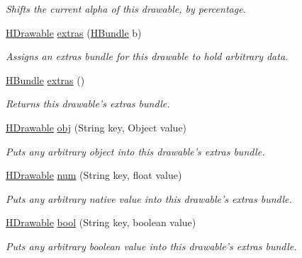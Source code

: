 \begin{DoxyCompactItemize}
\begin{DoxyCompactList}\small\item\em Shifts the current alpha of this drawable, by percentage. \end{DoxyCompactList}\item 
\hyperlink{classhype_1_1drawable_1_1_h_drawable}{H\-Drawable} \hyperlink{classhype_1_1drawable_1_1_h_drawable_ad4fa503b7d89fb5d1c75ccde9db95372}{extras} (\hyperlink{classhype_1_1util_1_1_h_bundle}{H\-Bundle} b)
\begin{DoxyCompactList}\small\item\em Assigns an {\itshape extras bundle} for this drawable to hold arbitrary data. \end{DoxyCompactList}\item 
\hyperlink{classhype_1_1util_1_1_h_bundle}{H\-Bundle} \hyperlink{classhype_1_1drawable_1_1_h_drawable_a7505189d57beed823910e448eada428e}{extras} ()
\begin{DoxyCompactList}\small\item\em Returns this drawable's {\itshape extras bundle}. \end{DoxyCompactList}\item 
\hyperlink{classhype_1_1drawable_1_1_h_drawable}{H\-Drawable} \hyperlink{classhype_1_1drawable_1_1_h_drawable_a89ded5375f1c76df4b672196303343fd}{obj} (String key, Object value)
\begin{DoxyCompactList}\small\item\em Puts any arbitrary object into this drawable's {\itshape extras bundle}. \end{DoxyCompactList}\item 
\hyperlink{classhype_1_1drawable_1_1_h_drawable}{H\-Drawable} \hyperlink{classhype_1_1drawable_1_1_h_drawable_a301762c66d0222fa940d766a5fc61d66}{num} (String key, float value)
\begin{DoxyCompactList}\small\item\em Puts any arbitrary native value into this drawable's {\itshape extras bundle}. \end{DoxyCompactList}\item 
\hyperlink{classhype_1_1drawable_1_1_h_drawable}{H\-Drawable} \hyperlink{classhype_1_1drawable_1_1_h_drawable_afd9c440d3b5d30006d2644d1f07dc23e}{bool} (String key, boolean value)
\begin{DoxyCompactList}\small\item\em Puts any arbitrary boolean value into this drawable's {\itshape extras bundle}. \end{DoxyCompactList}\item 

\end{DoxyCompactItemize}
